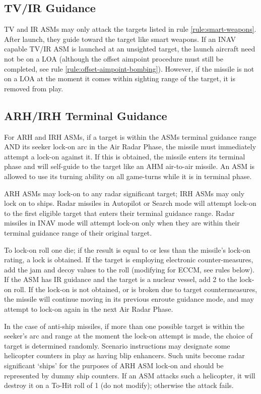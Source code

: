 \begin{advancedrules}
\begin{itemize}
    \end{itemize}

    \subsection{TV/IR Guidance} TV and IR ASMs may only attack the targets listed in rule \ref{rule:smart-weapons}.  After launch, they guide toward the target like smart weapons. If an INAV capable TV/IR ASM is launched at an unsighted target, the launch aircraft need not be on a LOA (although the offset aimpoint procedure must still be completed, see rule \ref{rule:offset-aimpoint-bombing}).  However, if the missile is not on a LOA at the moment it comes within sighting range of the target, it is removed from play.

    \subsection{ARH/IRH Terminal Guidance} For ARH and IRH ASMs, if a target is within the ASMs terminal guidance range AND its seeker lock-on arc in the Air Radar Phase, the missile must immediately attempt a lock-on against it.  If this is obtained, the missile enters its terminal phase and will self-guide to the target like an AHM air-to-air missile.  An ASM is allowed to use its turning ability on all game-turns while it is in terminal phase.

    ARH ASMs may lock-on to any radar significant target; IRH ASMs may only lock on to ships.  Radar missiles in Autopilot or Search mode will attempt lock-on to the first eligible target that enters their terminal guidance range.  Radar missiles in INAV mode will attempt lock-on only when they are within their terminal guidance range of their original target.

    To lock-on roll one die; if the result is equal to or less than the missile's lock-on rating, a lock is obtained. If the target is employing electronic counter-measures, add the jam and decoy values to the roll (modifying for ECCM, see rules below).  If the ASM has IR guidance and the target is a nuclear vessel, add 2 to the lock-on roll.  If the lock-on is not obtained, or is broken due to target countermeasures, the missile will continue moving in its previous enroute guidance mode, and may attempt to lock-on again in the next Air Radar Phase.

    In the case of anti-ship missiles, if more than one possible target is within the seeker's arc and range at the moment the lock-on attempt is made, the choice of target is determined randomly. Scenario instructions may designate some helicopter counters in play as having blip enhancers. Such units become radar significant ‘ships' for the purposes of ARH ASM lock-on and should be represented by dummy ship counters.  If an ASM attacks such a helicopter, it will destroy it on a To-Hit roll of 1 (do not modify); otherwise the attack fails.


\end{advancedrules}
